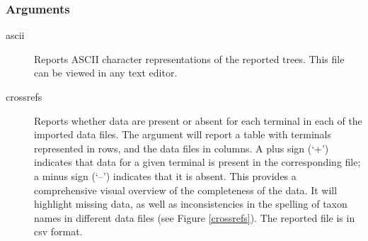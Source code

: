 	\subsubsection{Arguments}
	\begin{description}
		

		\item[ascii] Reports ASCII character representations of the reported trees.
		This file can be viewed in any text editor.
		

		
		\item[crossrefs] Reports whether data are present or absent for each terminal 
		in each of the imported data files. The argument will report a table with terminals 
		represented in rows, and the data files in columns. A plus sign (`+') indicates that 
		data for a given terminal is present in the corresponding file; a minus sign (`--') 
		indicates that it is absent. This provides a comprehensive visual overview of the 
		completeness of the data. It will highlight missing data, as well as inconsistencies 
		in the spelling of taxon names in different data files (see Figure \ref{crossrefs}).  
		The reported file is in csv format.
		

\end{description}
